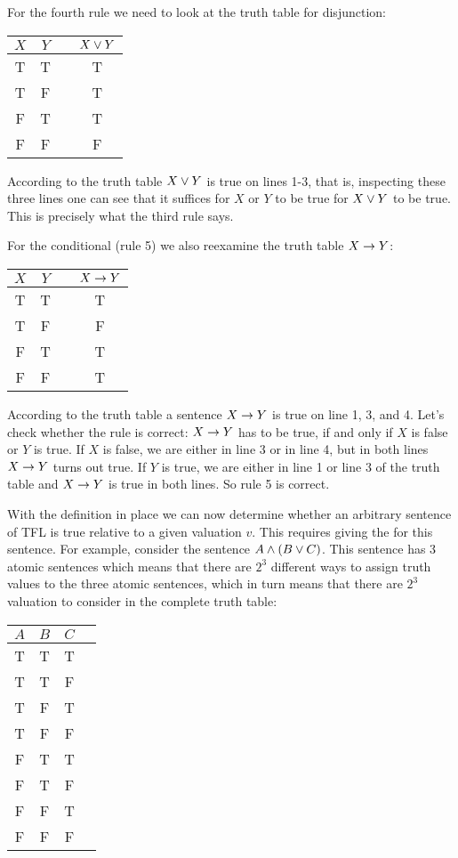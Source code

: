For the fourth rule we need to look at the truth table for disjunction:
\begin{center}
\begin{tabular}{ccc|c}
$X$&$Y$&&$X\vee Y$\\\hline
T & T && T\\
T & F && T\\
F & T && T\\
F & F && F
\end{tabular}
\end{center}
According to the truth table $X\vee Y$ is true on lines 1-3, that is, inspecting these three lines one can see that it suffices for $X$ or $Y$ to be true for $X\vee Y$ to be true. This is precisely what the third rule says.

For the conditional (rule 5) we also reexamine the truth table $X\rightarrow Y$:
\begin{center}
\begin{tabular}{ccc|c}
$X$&$Y$&&$X\rightarrow Y$\\\hline
T & T && T\\
T & F && F\\
F & T && T\\
F & F && T
\end{tabular}
\end{center}
According to the truth table a sentence $X\rightarrow Y$ is true on line 1, 3, and 4. Let's check whether the rule is correct: $X\rightarrow Y$ has to be true, if and only if $X$ is false or $Y$ is true. If $X$ is false, we are either in line 3 or in line 4, but in both lines $X\rightarrow Y$ turns out true. If $Y$ is true, we are either in line 1 or line 3 of the truth table and $X\rightarrow Y$ is true in both lines. So rule 5 is correct.

With the definition in place we can now determine whether an arbitrary sentence of TFL is true relative to a given valuation $v$. This requires giving the  for this sentence. For example, consider the sentence $A\mathbin{\wedge}(B\vee C)$. This sentence has 3 atomic sentences which means that there are $2^3$ different ways to assign truth values to the three atomic sentences, which in turn means that there are $2^3$ valuation to consider in the complete truth table: 

\begin{center}
\begin{tabular}{ccc|c}
$A$&$B$&$C$&\\\hline
T& T &T&\\
T & T & F&\\
T & F & T& \\
T & F &F&\\
F & T &T&\\
F& T & F & \\
F & F & T &\\
F & F & F& 
\end{tabular}
\end{center}


